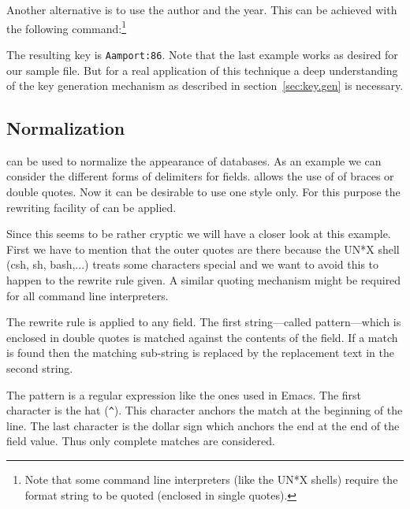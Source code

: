 \documentclass[11pt,a4paper]{scrbook}
\begin{document}
Another alternative is to use the author and the year. This can be achieved
with the following command:\footnote{Note that some command line interpreters
  (like the UN*X shells) require the format string to be quoted (enclosed in
  single quotes).}


The resulting key is \texttt{Aamport:86}. Note that the last example works as
desired for our sample file. But for a real application of this technique a
deep understanding of the key generation mechanism as described in
section~\ref{sec:key.gen} is necessary.


\subsection{Normalization}\label{sample.norm}

\BibTool{} can be used to normalize the appearance of \BibTeX{} databases. As
an example we can consider the different forms of delimiters for fields.
\BibTeX{} allows the use of of braces or double quotes. Now it can be
desirable to use one style only. For this purpose the rewriting facility of
\BibTool{} can be applied.


Since this seems to be rather cryptic we will have a closer look at this
example. First we have to mention that the outer quotes are there because the
UN*X shell (csh, sh, bash,...) treats some characters special and we want to
avoid this to happen to the rewrite rule given. A similar quoting mechanism
might be required for all command line interpreters.

The rewrite rule is applied to any field. The first string---called
pattern---which is enclosed in double quotes is matched against the contents
of the field. If a match is found then the matching sub-string is replaced by
the replacement text in the second string.

The pattern is a regular expression like the ones
used in Emacs. The first character is the hat (\verb|^|). This
character anchors the match at the beginning of the line. The last character
is the dollar sign which anchors the end at the end of the field value. Thus
only complete matches are considered.
\end{document}

